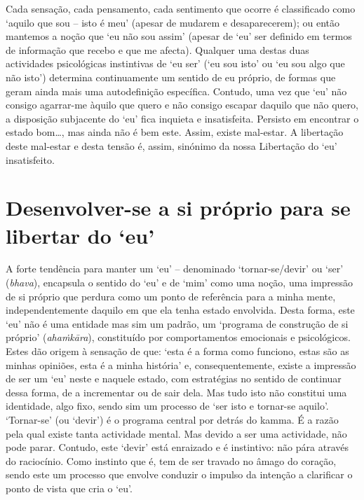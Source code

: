 Cada sensação, cada pensamento, cada sentimento que ocorre é classificado como
`aquilo que sou -- isto é meu' (apesar de mudarem e desaparecerem); ou então
mantemos a noção que `eu não sou assim' (apesar de `eu' ser definido em termos
de informação que recebo e que me afecta). Qualquer uma destas duas actividades
psicológicas instintivas de `eu ser' (`eu sou isto' ou `eu sou algo que não
isto') determina continuamente um sentido de eu próprio, de formas que geram
ainda mais uma autodefinição específica. Contudo, uma vez que `eu' não consigo
agarrar-me àquilo que quero e não consigo escapar daquilo que não quero, a
disposição subjacente do `eu' fica inquieta e insatisfeita. Persisto em
encontrar o estado bom\ldots{}, mas ainda não é bem este. Assim, existe mal-estar.
A libertação deste mal-estar e desta tensão é, assim, sinónimo da nossa
Libertação do `eu' insatisfeito.

\section{Desenvolver-se a si próprio para se libertar do `eu\kern -0.5pt'}

A forte tendência para manter um `eu' -- denominado `tornar-se/devir' ou `ser'
(\emph{bhava}), encapsula o sentido do `eu' e de `mim' como uma noção, uma
impressão de si próprio que perdura como um ponto de referência para a minha
mente, independentemente daquilo em que ela tenha estado envolvida. Desta forma,
este `eu' não é uma entidade mas sim um padrão, um `programa de construção de si
próprio' (\emph{ahaṁkāra}), constituído por comportamentos emocionais e
psicológicos. Estes dão origem à sensação de que: `esta é a forma como funciono,
estas são as minhas opiniões, esta é a minha história' e, consequentemente,
existe a impressão de ser um `eu' neste e naquele estado, com estratégias no
sentido de continuar dessa forma, de a incrementar ou de sair dela. Mas tudo
isto não constitui uma identidade, algo fixo, sendo sim um processo de `ser isto
e tornar-se aquilo'. `Tornar-se' (ou `devir') é o programa central por detrás do
kamma. É a razão pela qual existe tanta actividade mental. Mas devido a ser uma
actividade, não pode parar. Contudo, este `devir' está enraizado e é instintivo:
não pára através do raciocínio. Como instinto que é, tem de ser travado no âmago
do coração, sendo este um processo que envolve conduzir o impulso da intenção a
clarificar o ponto de vista que cria o `eu'.

